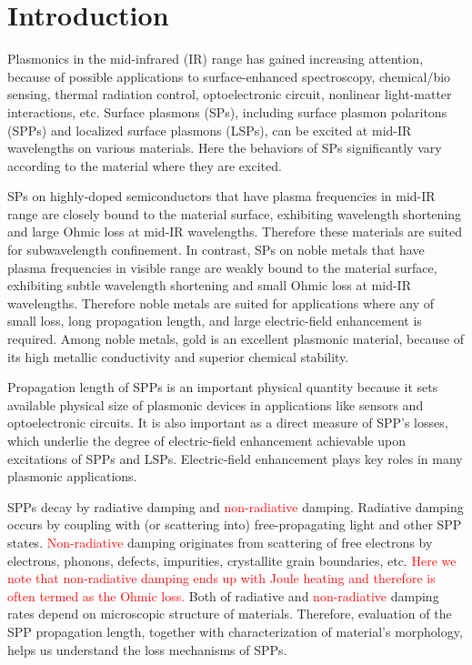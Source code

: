 \documentclass[aip,apl,reprint]{revtex4-1}
\begin{document}
\section{Introduction}
Plasmonics in the mid-infrared (IR) range has gained increasing attention,\cite{Stanley, Law} because of possible applications to surface-enhanced spectroscopy,\cite{Neubrech, Hoang} chemical/bio sensing,\cite{Cleary2008} thermal radiation control,\cite{Kusunoki} optoelectronic circuit,\cite{Ebbesen, Soref} nonlinear light-matter interactions,\cite{Kusa2015} etc. Surface plasmons (SPs), including surface plasmon polaritons (SPPs) and localized surface plasmons (LSPs), can be excited at mid-IR wavelengths on various materials.\cite{Law} Here the behaviors of SPs significantly vary according to the material where they are excited.\cite{Law} 

SPs on highly-doped semiconductors that have plasma frequencies in mid-IR range are closely bound to the material surface, exhibiting wavelength shortening and large Ohmic loss at mid-IR wavelengths. Therefore these materials are suited for subwavelength confinement. In contrast, SPs on noble metals that have plasma frequencies in visible range are weakly bound to the material surface, exhibiting subtle wavelength shortening and small Ohmic loss at mid-IR wavelengths. Therefore noble metals are suited for applications where any of small loss, long propagation length, and large electric-field enhancement is required.\cite{Law, Kusa2014}
Among noble metals, gold is an excellent plasmonic material, because of its high metallic conductivity and superior chemical stability.\cite{Zayats}

Propagation length of SPPs is an important physical quantity\cite{Kuttge, Peale2008} because it sets available physical size of plasmonic devices in applications like sensors and optoelectronic circuits. It is also important as a direct measure of SPP's losses, which underlie the degree of electric-field enhancement achievable upon excitations of SPPs and LSPs. Electric-field enhancement plays key roles in many plasmonic applications.


SPPs decay by radiative damping and \textcolor{red}{non-radiative} damping. Radiative damping occurs by coupling with (or scattering into) free-propagating light and other SPP states. \textcolor{red}{Non-radiative} damping originates from scattering of free electrons by electrons, phonons, defects, impurities, crystallite grain boundaries, etc.\cite{Yang} \textcolor{red}{Here we note that non-radiative damping ends up with Joule heating and therefore is often termed as the Ohmic loss.\cite{Kuttge}} 
Both of radiative and \textcolor{red}{non-radiative} damping rates depend on microscopic structure of materials. Therefore, evaluation of the SPP propagation length, together with characterization of material's morphology, helps us understand the loss mechanisms of SPPs.
\end{document}

